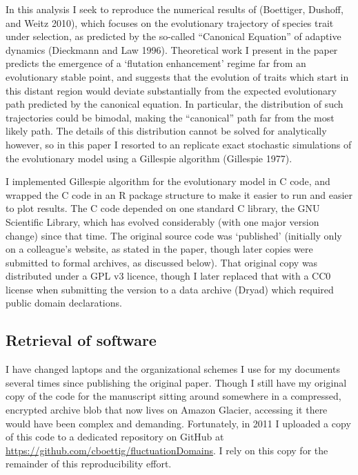 \documentclass[
]{rescience}
\begin{document}
In this analysis I seek to reproduce the numerical results of (Boettiger,
Dushoff, and Weitz 2010), which focuses on the evolutionary trajectory
of species trait under selection, as predicted by the so-called
``Canonical Equation'' of adaptive dynamics (Dieckmann and Law 1996).
Theoretical work I present in the paper predicts the emergence of a
`flutation enhancement' regime far from an evolutionary stable point,
and suggests that the evolution of traits which start in this distant
region would deviate substantially from the expected evolutionary path
predicted by the canonical equation. In particular, the distribution of
such trajectories could be bimodal, making the ``canonical'' path far
from the most likely path. The details of this distribution cannot be
solved for analytically however, so in this paper I resorted to an
replicate exact stochastic simulations of the evolutionary model using a
Gillespie algorithm (Gillespie 1977).

I implemented Gillespie algorithm for the evolutionary model in C code,
and wrapped the C code in an R package structure to make it easier to
run and easier to plot results. The C code depended on one standard C
library, the GNU Scientific Library, which has evolved considerably
(with one major version change) since that time. The original source
code was `published' (initially only on a colleague's website, as stated
in the paper, though later copies were submitted to formal archives, as
discussed below). That original copy was distributed under a GPL v3
licence, though I later replaced that with a CC0 license when submitting
the version to a data archive (Dryad) which required public domain
declarations.

\hypertarget{retrieval-of-software}{%
\subsection{Retrieval of software}\label{retrieval-of-software}}

I have changed laptops and the organizational schemes I use for my
documents several times since publishing the original paper. Though I
still have my original copy of the code for the manuscript sitting
around somewhere in a compressed, encrypted archive blob that now lives
on Amazon Glacier, accessing it there would have been complex and
demanding. Fortunately, in 2011 I uploaded a copy of this code to a
dedicated repository on GitHub at
\url{https://github.com/cboettig/fluctuationDomains}. I rely on this
copy for the remainder of this reproducibility effort.
\end{document}
